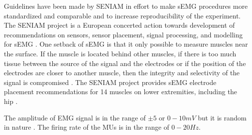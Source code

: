 \documentclass[../main.tex]{subfiles}
\begin{document}
Guidelines have been made by \ac{SENIAM} in effort to make \ac{sEMG} procedures more standardized and comparable and to increase reproducibility of the experiment. 
The \ac{SENIAM} project is a European concerted action towards development of recommendations on sensors, sensor placement, signal processing, and modelling for \ac{sEMG} \cite{Hermens1999, Hermens2000}.
One setback of \ac{sEMG} is that it only possible to measure muscles near the surface.
If the muscle is located behind other muscles, if there is too much tissue between the source of the signal and the electrodes or if the position of the electrodes are closer to another muscle, then the integrity and selectivity of the signal is compromised \cite{Farina2016, Hermens2000}.
The \ac{SENIAM} project provides \ac{sEMG} electrode placement recommendations for 14 muscles on lower extremities, including the hip \cite{Hermens1999}.

The amplitude of \ac{EMG} signal is in the range of $\pm 5$ or $0-10 mV$ but it is random in nature \cite{Raez2006}.
The firing rate of the \acp{MU} is in the range of $0-20Hz$.
\end{document}
